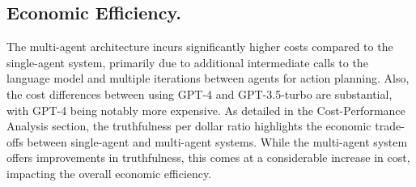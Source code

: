         
        \subsection{Economic Efficiency.} 
            The multi-agent architecture incurs significantly higher costs compared to the single-agent system, primarily due to additional intermediate calls to the language model and multiple iterations between agents for action planning. 
            Also, the cost differences between using GPT-4 and GPT-3.5-turbo are substantial, with GPT-4 being notably more expensive.
            As detailed in the Cost-Performance Analysis section, the truthfulness per dollar ratio highlights the economic trade-offs between single-agent and multi-agent systems. While the multi-agent system offers improvements in truthfulness, this comes at a considerable increase in cost, impacting the overall economic efficiency.
            

